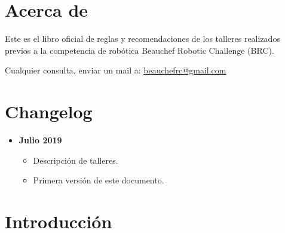 \section*{Acerca de}
Este es el libro oficial de reglas y recomendaciones de los talleres realizados previos a la competencia de robótica Beauchef Robotic Challenge (BRC).

Cualquier consulta, enviar un mail a: \href{mailto:beauchefrc@gmail.com}{beauchefrc@gmail.com}






\section*{Changelog}

\begin{itemize}
  \item \textbf{Julio 2019}
  \begin{itemize}
    \item Descripción de talleres.
    \item Primera versión de este documento.
  \end{itemize}
\end{itemize}

\pagebreak

\section{Introducción}

